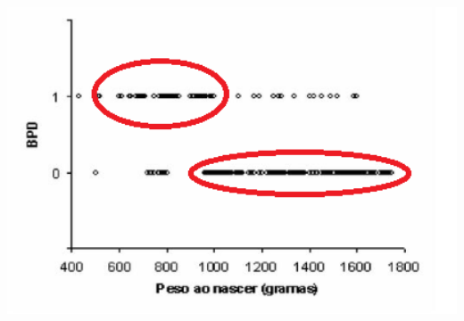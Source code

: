 \documentclass[
  letterpaper,
  DIV=11,
  numbers=noendperiod]{scrartcl}
\begin{document}
\includegraphics[width=6.25in,height=4.6875in]{../../images/BPD_disp2.png}
\end{document}
